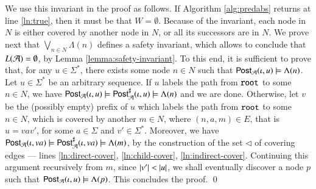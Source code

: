 \documentclass[10pt,conference,letterpaper,twocolumn]{IEEEtran}
\begin{document}
{  We use this invariant in the proof as follows. If Algorithm
  \ref{alg:predabs} returns at line \ref{ln:true}, then it must be
  that $W = \emptyset$. Because of the invariant, each node in $N$ is
  either covered by another node in $N$, or all its successors are in
  $N$. We prove next that $\bigvee_{n \in N} \Lambda(n)$ defines a
  safety invariant, which allows to conclude that $L(\mathcal{A}) = \emptyset$,
  by Lemma \ref{lemma:safety-invariant}. To this end, it is sufficient
  to prove that, for any $u \in \Sigma^*$, there exists some node $n
  \in N$ such that $\mathsf{Post}_{\mathcal{A}}(\iota,u) \models \Lambda(n)$. Let $u \in
  \Sigma^*$ be an arbitrary sequence. If $u$ labels the path from
  $\mathtt{root}$ to some $n \in N$, we have $\mathsf{Post}_{\mathcal{A}}(\iota,u) \models
  {\mathsf{Post}}^\sharp_{\mathcal{A}}(\iota,u) \models \Lambda(n)$ and we are
  done. Otherwise, let $v$ be the (possibly empty) prefix of $u$ which
  labels the path from $\mathtt{root}$ to some $n \in N$, which is covered
  by another $m \in N$, where $(n,a,m) \in E$, that is $u = vav'$, for
  some $a \in \Sigma$ and $v'\in\Sigma^*$. Moreover, we have
  $\mathsf{Post}_{\mathcal{A}}(\iota,va) \models {\mathsf{Post}}^\sharp_{\mathcal{A}}(\iota,va) \models
  \Lambda(m)$, by the construction of the set $\lhd$ of covering edges
  --- lines \ref{ln:direct-cover}, \ref{ln:child-cover},
  \ref{ln:indirect-cover}. Continuing this argument recursively from
  $m$, since ${|{v'}|} < {|{u}|}$, we shall eventually discover a node
  $p$ such that $\mathsf{Post}_{\mathcal{A}}(\iota,u) \models \Lambda(p)$. This
  concludes the proof. \qed}

 

\end{document}

